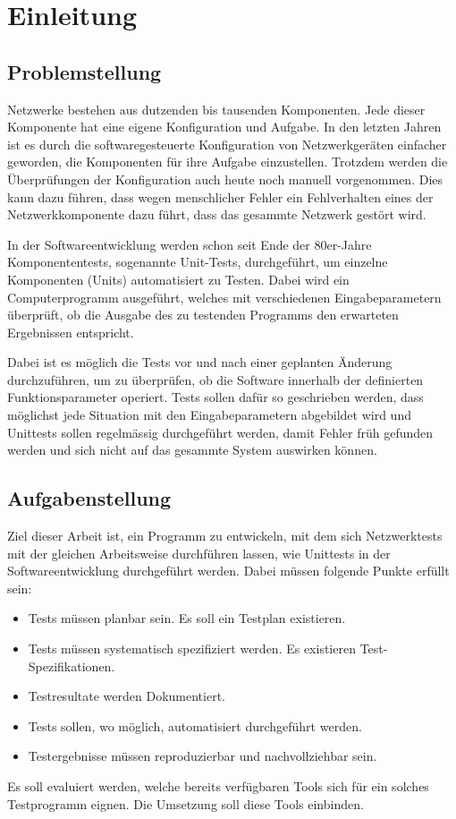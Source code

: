\documentclass[]{subfiles}
\begin{document}
    \section{Einleitung}
    \subsection{Problemstellung}
    Netzwerke bestehen aus dutzenden bis tausenden Komponenten. 
    Jede dieser Komponente hat eine eigene Konfiguration und Aufgabe.
    In den letzten Jahren ist es durch die softwaregesteuerte Konfiguration
    von Netzwerkgeräten einfacher geworden, die Komponenten für ihre
    Aufgabe einzustellen. Trotzdem werden die Überprüfungen der Konfiguration 
    auch heute noch manuell vorgenommen. Dies kann dazu führen, dass wegen menschlicher
    Fehler ein Fehlverhalten eines der Netzwerkkomponente dazu führt,
    dass das gesammte Netzwerk gestört wird. 
    
    In der Softwareentwicklung werden schon seit 
    Ende der 80er-Jahre Komponententests, sogenannte Unit-Tests, durchgeführt, um einzelne 
    Komponenten (Units) automatisiert zu Testen. Dabei wird ein Computerprogramm ausgeführt,
    welches mit verschiedenen Eingabeparametern überprüft, ob die Ausgabe des zu testenden
    Programms den erwarteten Ergebnissen entspricht.

    Dabei ist es möglich die Tests vor und nach einer geplanten Änderung durchzuführen,
    um zu überprüfen, ob die Software innerhalb der definierten Funktionsparameter operiert.
    Tests sollen dafür so geschrieben werden, dass möglichst jede Situation mit den 
    Eingabeparametern abgebildet wird und Unittests sollen regelmässig durchgeführt werden,
    damit Fehler früh gefunden werden und sich nicht auf das gesammte System auswirken können.

    \subsection{Aufgabenstellung}
    Ziel dieser Arbeit ist, ein Programm zu entwickeln, mit dem sich Netzwerktests mit 
    der gleichen Arbeitsweise durchführen lassen, wie Unittests in der Softwareentwicklung
    durchgeführt werden. Dabei müssen folgende Punkte erfüllt sein:
    \begin{itemize}
        \item Tests müssen planbar sein. Es soll ein Testplan existieren.
        \item Tests müssen systematisch spezifiziert werden. Es existieren Test-Spezifikationen.
        \item Testresultate werden Dokumentiert.
        \item Tests sollen, wo möglich, automatisiert durchgeführt werden.
        \item Testergebnisse müssen reproduzierbar und nachvollziehbar sein.
    \end{itemize}
    Es soll evaluiert werden, welche bereits verfügbaren Tools sich für ein solches Testprogramm
    eignen. Die Umsetzung soll diese Tools einbinden. 
    
\end{document}
